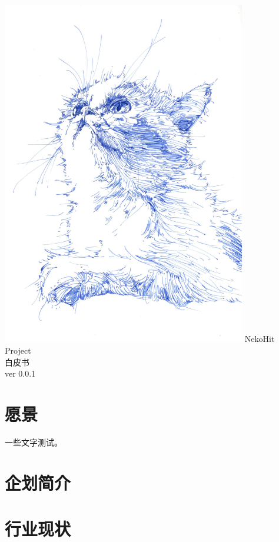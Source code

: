 \documentclass[11pt,UTF8,a4paper]{ctexart}
\begin{document}
    \begin{titlepage}
        \centering
        \vfill
        \includegraphics[width=0.8\textwidth]{assets/img196}
        \vfill
        {\Huge
        \textsf{NekoHit Project}\\
        白皮书\\
        \vskip2cm
        \vfill
        \Large
        ver 0.0.1
        }
        \vfill
        \vfill
    \end{titlepage}
    \tableofcontents
    \clearpage

    \section{愿景}\label{sec:goal}

    一些文字测试\cite{article}。

    \section{企划简介}\label{sec:intro}


    \section{行业现状}\label{sec:now}
\end{document}
